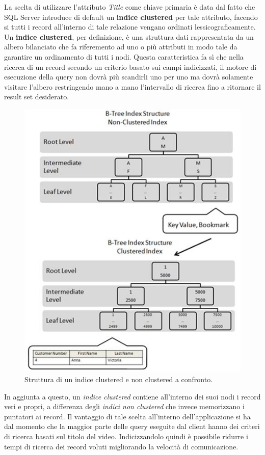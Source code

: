 \documentclass[a4]{book}
\begin{document}
La scelta di utilizzare l'attributo \textit{Title} come chiave primaria è data dal fatto che SQL Server introduce di default un \textbf{indice clustered} per tale attributo, facendo si tutti i record all'interno di tale relazione vengano ordinati lessicograficamente. Un \textbf{indice clustered}, per definizione, è una struttura dati rappresentata da un albero bilanciato che fa riferemento ad uno o più attributi in modo tale da garantire un ordinamento di tutti i nodi. Questa caratteristica fa sì che nella ricerca di un record secondo un criterio basato sui campi indicizzati, il motore di esecuzione della query non dovrà più scandirli uno per uno ma dovrà solamente visitare l'albero restringendo mano a mano l'intervallo di ricerca fino a ritornare il result set desiderato.

\begin{figure}

\caption{Struttura di un indice clustered e non clustered a confronto.}
\includegraphics{index}
\medskip
\small
\end{figure}

In aggiunta a questo, un \textit{indice clustered} contiene all'interno dei suoi nodi i record veri e propri, a differenza degli \textit{indici non clustered} che invece memorizzano i puntatori ai record. Il vantaggio di tale scelta all'interno dell'applicazione si ha dal momento che la maggior parte delle query eseguite dal client hanno dei criteri di ricerca basati sul titolo del video. Indicizzandolo quindi è possibile ridurre i tempi di ricerca dei record voluti migliorando la velocità di comunicazione. \newline
\end{document}
